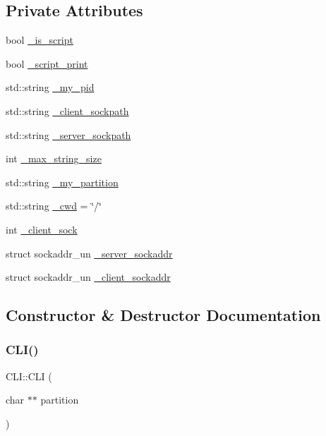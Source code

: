 \subsection*{Private Attributes}
\begin{DoxyCompactItemize}
\item 
bool \mbox{\hyperlink{class_c_l_i_a93c65474d55597296ddda4739664ea27}{\+\_\+is\+\_\+script}}
\item 
bool \mbox{\hyperlink{class_c_l_i_a294b192f7400c451c7d4ee983ca11d21}{\+\_\+script\+\_\+print}}
\item 
std\+::string \mbox{\hyperlink{class_c_l_i_a589aa7edb9b2454720d5b54af3ddea00}{\+\_\+my\+\_\+pid}}
\item 
std\+::string \mbox{\hyperlink{class_c_l_i_ad3b7579608f8c2e1d4c01a8668f701d9}{\+\_\+client\+\_\+sockpath}}
\item 
std\+::string \mbox{\hyperlink{class_c_l_i_a582f907a9e5dc5c0dcd264e2f1b14f76}{\+\_\+server\+\_\+sockpath}}
\item 
int \mbox{\hyperlink{class_c_l_i_a13b5699d950ce765cad098f7613a3e20}{\+\_\+max\+\_\+string\+\_\+size}}
\item 
std\+::string \mbox{\hyperlink{class_c_l_i_aa58101a66621f7b2b64d4e566ad7bd89}{\+\_\+my\+\_\+partition}}
\item 
std\+::string \mbox{\hyperlink{class_c_l_i_a664097f330fa6beaad30f35eb9577ce1}{\+\_\+cwd}} = \char`\"{}/\char`\"{}
\item 
int \mbox{\hyperlink{class_c_l_i_a89c215687bff66a3e0359a17bac3657d}{\+\_\+client\+\_\+sock}}
\item 
struct sockaddr\+\_\+un \mbox{\hyperlink{class_c_l_i_a8100e64420f5528d1a09a18433ae24f9}{\+\_\+server\+\_\+sockaddr}}
\item 
struct sockaddr\+\_\+un \mbox{\hyperlink{class_c_l_i_a8c449fcba5105eec8d582c4695bfaca9}{\+\_\+client\+\_\+sockaddr}}
\end{DoxyCompactItemize}


\subsection{Constructor \& Destructor Documentation}
\mbox{\label{class_c_l_i_a0c3b5662a3f33b5a76021be177c3eef2}} 
\subsubsection{\texorpdfstring{C\+L\+I()}{CLI()}\hspace{0.1cm}{\footnotesize\ttfamily [1/4]}}
{\footnotesize\ttfamily C\+L\+I\+::\+C\+LI (\begin{DoxyParamCaption}\item[{char $\ast$$\ast$}]{partition }\end{DoxyParamCaption})}



